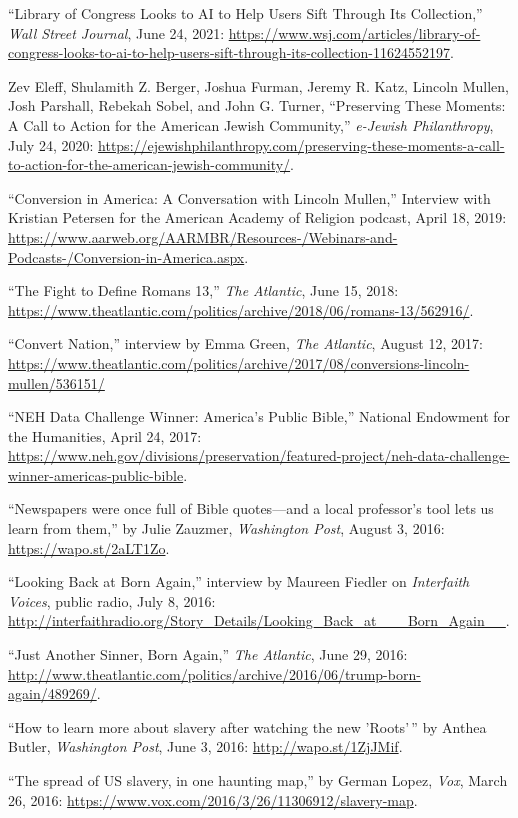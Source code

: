 \documentclass[11pt]{article}
\begin{document}
``Library of Congress Looks to AI to Help Users Sift Through Its Collection,'' \emph{Wall Street Journal}, June 24, 2021: \url{https://www.wsj.com/articles/library-of-congress-looks-to-ai-to-help-users-sift-through-its-collection-11624552197}.

Zev Eleff, Shulamith Z. Berger, Joshua Furman, Jeremy R. Katz, Lincoln Mullen, 
Josh Parshall, Rebekah Sobel, and John G. Turner, ``Preserving These Moments: A Call to Action for the American Jewish Community,'' \emph{e-Jewish Philanthropy}, July 24, 2020: \url{https://ejewishphilanthropy.com/preserving-these-moments-a-call-to-action-for-the-american-jewish-community/}.

``Conversion in America: A Conversation with Lincoln Mullen,'' Interview with Kristian Petersen for the American Academy of Religion podcast, April 18, 2019: \url{https://www.aarweb.org/AARMBR/Resources-/Webinars-and-Podcasts-/Conversion-in-America.aspx}.

``The Fight to Define Romans 13,'' \emph{The Atlantic}, June 15, 2018: \url{https://www.theatlantic.com/politics/archive/2018/06/romans-13/562916/}.

``Convert Nation,'' interview by Emma Green, \emph{The Atlantic}, August 12, 2017: \url{https://www.theatlantic.com/politics/archive/2017/08/conversions-lincoln-mullen/536151/}

``NEH Data Challenge Winner: America's Public Bible,'' National Endowment for the Humanities, April 24, 2017: \url{https://www.neh.gov/divisions/preservation/featured-project/neh-data-challenge-winner-americas-public-bible}.

``Newspapers were once full of Bible quotes---and a local professor's tool lets us learn from them,'' by Julie Zauzmer, \emph{Washington Post}, August 3, 2016: \url{https://wapo.st/2aLT1Zo}.

``Looking Back at Born Again,'' interview by Maureen Fiedler on \emph{Interfaith Voices}, public radio, July 8, 2016: \url{http://interfaithradio.org/Story_Details/Looking_Back_at___Born_Again__}.

``Just Another Sinner, Born Again,'' \emph{The Atlantic}, June 29, 2016: \url{http://www.theatlantic.com/politics/archive/2016/06/trump-born-again/489269/}.

``How to learn more about slavery after watching the new 'Roots'\,'' by Anthea Butler, \emph{Washington Post}, June 3, 2016: \url{http://wapo.st/1ZjJMif}.

``The spread of US slavery, in one haunting map,'' by German Lopez, \emph{Vox}, March 26, 2016: \url{https://www.vox.com/2016/3/26/11306912/slavery-map}.
\end{document}

